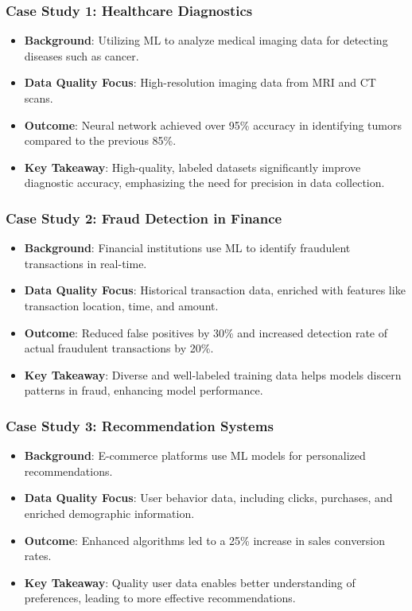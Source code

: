 \documentclass[aspectratio=169]{beamer}
\begin{document}
\begin{frame}[fragile]
    \frametitle{Case Study 1: Healthcare Diagnostics}
    \begin{itemize}
        \item \textbf{Background}: Utilizing ML to analyze medical imaging data for detecting diseases such as cancer.
        \item \textbf{Data Quality Focus}: High-resolution imaging data from MRI and CT scans.
        \item \textbf{Outcome}: Neural network achieved over 95\% accuracy in identifying tumors compared to the previous 85\%.
        \item \textbf{Key Takeaway}: High-quality, labeled datasets significantly improve diagnostic accuracy, emphasizing the need for precision in data collection.
    \end{itemize}
\end{frame}

\begin{frame}[fragile]
    \frametitle{Case Study 2: Fraud Detection in Finance}
    \begin{itemize}
        \item \textbf{Background}: Financial institutions use ML to identify fraudulent transactions in real-time.
        \item \textbf{Data Quality Focus}: Historical transaction data, enriched with features like transaction location, time, and amount.
        \item \textbf{Outcome}: Reduced false positives by 30\% and increased detection rate of actual fraudulent transactions by 20\%.
        \item \textbf{Key Takeaway}: Diverse and well-labeled training data helps models discern patterns in fraud, enhancing model performance.
    \end{itemize}
\end{frame}

\begin{frame}[fragile]
    \frametitle{Case Study 3: Recommendation Systems}
    \begin{itemize}
        \item \textbf{Background}: E-commerce platforms use ML models for personalized recommendations.
        \item \textbf{Data Quality Focus}: User behavior data, including clicks, purchases, and enriched demographic information.
        \item \textbf{Outcome}: Enhanced algorithms led to a 25\% increase in sales conversion rates.
        \item \textbf{Key Takeaway}: Quality user data enables better understanding of preferences, leading to more effective recommendations.
    \end{itemize}
\end{frame}
\end{document}
